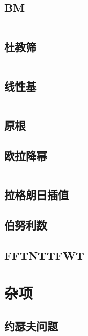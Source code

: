 \documentclass[a4paper,11pt]{article}
\begin{document}
\subsection{BM}
\inputminted[breaklines]{c++}{Math/BM.cpp}

\subsection{杜教筛}
\inputminted[breaklines]{c++}{Math/杜教筛.cpp}

\subsection{线性基}
\inputminted[breaklines]{c++}{Math/线性基.cpp}

\subsection{原根}


\subsection{欧拉降幂}
\inputminted[breaklines]{c++}{Math/欧拉降幂.cpp}

\subsection{拉格朗日插值}


\subsection{伯努利数}


\subsection{FFTNTTFWT}



\newpage
\section{杂项}

\subsection{约瑟夫问题}

\end{document}
